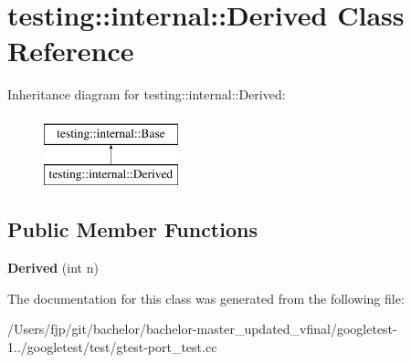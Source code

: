\hypertarget{classtesting_1_1internal_1_1_derived}{}\section{testing\+:\+:internal\+:\+:Derived Class Reference}
\label{classtesting_1_1internal_1_1_derived}
Inheritance diagram for testing\+:\+:internal\+:\+:Derived\+:\begin{figure}[H]
\begin{center}
\leavevmode
\includegraphics[height=2.000000cm]{classtesting_1_1internal_1_1_derived}
\end{center}
\end{figure}
\subsection*{Public Member Functions}
\begin{DoxyCompactItemize}
\item 
\mbox{\label{classtesting_1_1internal_1_1_derived_a05a8e8354c7c09a9f3728a96c96f1edd}} 
{\bfseries Derived} (int n)
\end{DoxyCompactItemize}


The documentation for this class was generated from the following file\+:\begin{DoxyCompactItemize}
\item 
/\+Users/fjp/git/bachelor/bachelor-\/master\+\_\+updated\+\_\+vfinal/googletest-\/1../googletest/test/gtest-\/port\+\_\+test.\+cc\end{DoxyCompactItemize}
